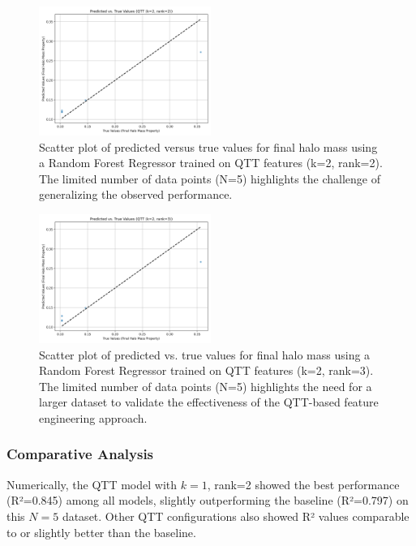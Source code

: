 \documentclass[twocolumn]{aastex631}
\begin{document}
\begin{figure}[h!]
    \centering
    \includegraphics[width=0.5\textwidth]{../input_files/plots/pred_vs_true_qtt_k2_r2_10_20250524-175150.png}
    \caption{Scatter plot of predicted versus true values for final halo mass using a Random Forest Regressor trained on QTT features (k=2, rank=2). The limited number of data points (N=5) highlights the challenge of generalizing the observed performance.
}
    \label{fig:pred_vs_true_qtt_k2_r2}
\end{figure}

\begin{figure}[h!]
    \centering
    \includegraphics[width=0.5\textwidth]{../input_files/plots/pred_vs_true_qtt_k2_r3_13_20250524-175150.png}
    \caption{Scatter plot of predicted vs. true values for final halo mass using a Random Forest Regressor trained on QTT features (k=2, rank=3). The limited number of data points (N=5) highlights the need for a larger dataset to validate the effectiveness of the QTT-based feature engineering approach.
}
    \label{fig:pred_vs_true_qtt_k2_r3}
\end{figure}

\subsubsection{Comparative Analysis}
Numerically, the QTT model with $k=1$, rank=2 showed the best performance (R²=0.845) among all models, slightly outperforming the baseline (R²=0.797) on this $N=5$ dataset. Other QTT configurations also showed R² values comparable to or slightly better than the baseline.
\end{document}
